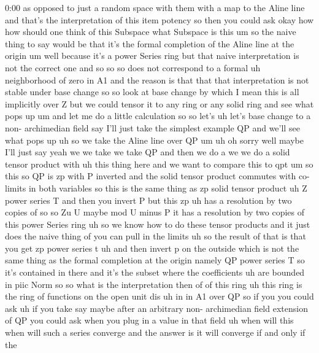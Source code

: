 \begin{unfinished}{0:00}
as  opposed  to  just  a  random  space  with
them  with  a  map  to  the  Aline  line  and
that's  the  interpretation  of  this  item
potency  so  then  you  could  ask  okay  how
how  should  one  think  of  this  Subspace
what  Subspace  is  this  um  so  the  naive
thing  to  say  would  be  that  it's  the
formal  completion  of  the  Aline  line  at
the
origin  um  well  because  it's  a  power
Series  ring  but  that  naive
interpretation  is  not  the  correct  one
and  so  so
so  does  not  correspond  to  a
formal  uh
neighborhood  of  zero  in  A1  and  the
reason  is  that  that  that  interpretation
is  not  stable  under  base  change  so  so
look  at  base
change  by  which  I  mean  this  is  all
implicitly  over  Z  but  we  could  tensor  it
to  any  ring  or  any  solid  ring  and  see
what  pops  up  um  and  let  me  do  a  little
calculation
so  so  let's  uh  let's  base  change  to  a
non-  archimedian  field  say  I'll  just
take  the  simplest  example  QP  and  we'll
see  what  pops
up  uh  so  we
take  the  Aline  line  over
QP
um  uh  oh  sorry  well  maybe  I'll  just  say
yeah  we  we  take  we  take  QP  and  then  we
do  a  we  we  do  a  solid  tensor  product
with  uh  this  thing  here  and  we  want  to
compare  this  to
qpt  um  so  this  so  QP  is  zp  with  P
inverted  and  the  solid  tensor  product
commutes  with  co-  limits  in  both
variables  so  this  is  the  same  thing  as
zp  solid  tensor  product
uh  Z  power  series  T  and  then  you  invert
P  but  this
zp  uh  has  a  resolution  by  two  copies  of
so  so  Zu  U  maybe  mod  U  minus  P  it  has  a
resolution  by  two  copies  of  this  power
Series  ring  uh  so  we  know  how  to  do
these  tensor  products  and  it  just  does
the  naive  thing  of  you  can  pull  in  the
limits  uh  so  the  result  of  that  is  that
you  get  zp  power  series
t  uh  and  then  invert  p  on  the
outside  which  is  not  the  same  thing  as
the  formal  completion  at  the  origin
namely  QP  power  series  T  so  it's
contained  in  there  and  it's  the  subset
where  the
coefficients  uh  are  bounded  in  piic
Norm
so  so  what  is  the  interpretation  then  of
of  this  ring  uh  this  ring  is  the  ring  of
functions  on  the  open  unit
dis  uh  in  in  A1  over
QP
so  if  you  you  could  ask  uh  if  you  take
say  maybe  after  an  arbitrary  non-
archimedian  field  extension  of  QP  you
could  ask  when  you  plug  in  a  value  in
that  field  uh  when  will  this  when  will
such  a  series  converge  and  the  answer  is
it  will  converge  if  and  only  if  the

\end{unfinished}
